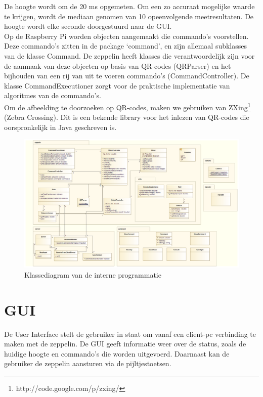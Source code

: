 \documentclass[eind]{penoverslag}
\begin{document}
De hoogte wordt om de 20 ms opgemeten. Om een zo accuraat mogelijke waarde te krijgen, wordt de mediaan genomen van 10 opeenvolgende meetresultaten. De hoogte wordt elke seconde doorgestuurd naar de GUI. \\

Op de Raspberry Pi worden objecten aangemaakt die commando's voorstellen. Deze commando's zitten in de package `command', en zijn allemaal subklasses van de klasse Command. De zeppelin heeft klasses die verantwoordelijk zijn voor de aanmaak van deze objecten op basis van QR-codes (QRParser) en het bijhouden van een rij van uit te voeren commando's (CommandController). De klasse CommandExecutioner zorgt voor de praktische implementatie van algoritmes van de commando's. \\

Om de afbeelding te doorzoeken op QR-codes, maken we gebruiken van ZXing\footnote{http://code.google.com/p/zxing/} (Zebra Crossing). Dit is een bekende library voor het inlezen van QR-codes die oorspronkelijk in Java geschreven is. \\

\begin{figure}[!ht]
\centering
\includegraphics[scale=0.3]{UML.png}
\caption{Klassediagram van de interne programmatie}
\label{UML}
\end{figure}

\section{GUI}
De User Interface stelt de gebruiker in staat om vanaf een client-pc verbinding te maken met de zeppelin. De GUI geeft informatie weer over de status, zoals de huidige hoogte en commando's die worden uitgevoerd. Daarnaast kan de gebruiker de zeppelin aansturen via de pijltjestoetsen. \\
\end{document}
